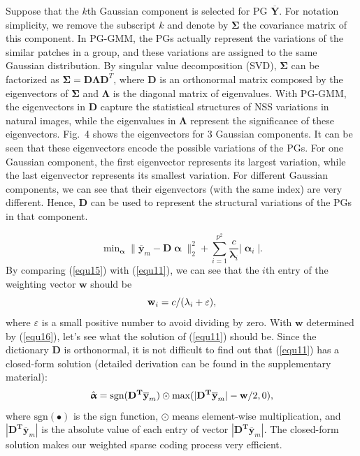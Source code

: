 \documentclass[10pt,twocolumn,letterpaper]{article}
\begin{document}
Suppose that the $k$th Gaussian component is selected for PG $\mathbf{\overline{Y}}$. For notation simplicity, we remove the subscript $k$ and denote by $\mathbf{\Sigma}$ the covariance matrix of this component. In PG-GMM, the PGs actually represent the variations of the similar patches in a group, and these variations are assigned to the same Gaussian distribution. By singular value decomposition (SVD), $\mathbf{\Sigma}$ can be factorized as $\mathbf{\Sigma} = \mathbf{D}\mathbf{\Lambda}\mathbf{D}^{T}$, where $\mathbf{D}$ is an orthonormal matrix composed by the eigenvectors of $\mathbf{\Sigma}$ and $\mathbf{\Lambda}$ is the diagonal matrix of eigenvalues. With PG-GMM, the eigenvectors  in $\mathbf{D}$ capture the statistical structures of NSS variations in natural images, while the eigenvalues in $\mathbf{\Lambda}$ represent the significance of these eigenvectors. Fig.\ 4 shows the eigenvectors for 3 Gaussian components. It can be seen that these eigenvectors encode the possible variations of the PGs. For one Gaussian component, the first eigenvector represents its largest variation, while the last eigenvector represents its smallest variation. For different Gaussian components, we can see that their eigenvectors (with the same index) are very different. Hence, $\mathbf{D}$ can be used to represent the structural variations of the PGs in that component.

\begin{equation}\label{equ5}
\min\nolimits_{\boldsymbol{\upalpha}}\|\mathbf{\overline{y}}_{m}-\mathbf{D}\boldsymbol{\upalpha}\|_{2}^{2}+\sum_{i=1}^{p^{2}}\frac{c}{\mathbf{\lambda}_{i}}|\boldsymbol{\upalpha}_{i}|.
\end{equation}
By comparing (\ref{equ15}) with (\ref{equ11}), we can see that the $i$th entry of the weighting vector $\mathbf{w}$ should be
\begin{equation}\label{equ6}
\setlength{\abovedisplayskip}{3pt}
\setlength{\belowdisplayskip}{3pt}
\mathbf{w}_{i} = c/(\mathbf{\lambda}_{i}+\varepsilon),
\end{equation}
where $\varepsilon$ is a small positive number to avoid dividing by zero. With $\mathbf{w}$ determined by (\ref{equ16}), let's see what the solution of (\ref{equ11}) should be. Since the dictionary $\mathbf{D}$ is orthonormal, it is not difficult to find out that (\ref{equ11}) has a closed-form solution (detailed derivation can be found in the supplementary material):
\begin{equation}\label{equ7}
\setlength{\abovedisplayskip}{3pt}
\setlength{\belowdisplayskip}{4pt}
\hat{\boldsymbol{\upalpha}}= \text{sgn}(\mathbf{D^{T}\overline{y}}_{m})\odot \text{max}(|\mathbf{D^{T}\overline{y}}_{m}|-\mathbf{w}/2,0),
\end{equation}
where $\text{sgn}(\bullet)$ is the sign function, $\odot$ means element-wise multiplication, and $|\mathbf{D^{T}\overline{y}}_{m}|$ is the absolute value of each entry of vector $|\mathbf{D^{T}\overline{y}}_{m}|$. The closed-form solution makes our weighted sparse coding process very efficient. 
\vspace{-0.05in}
\end{document}

